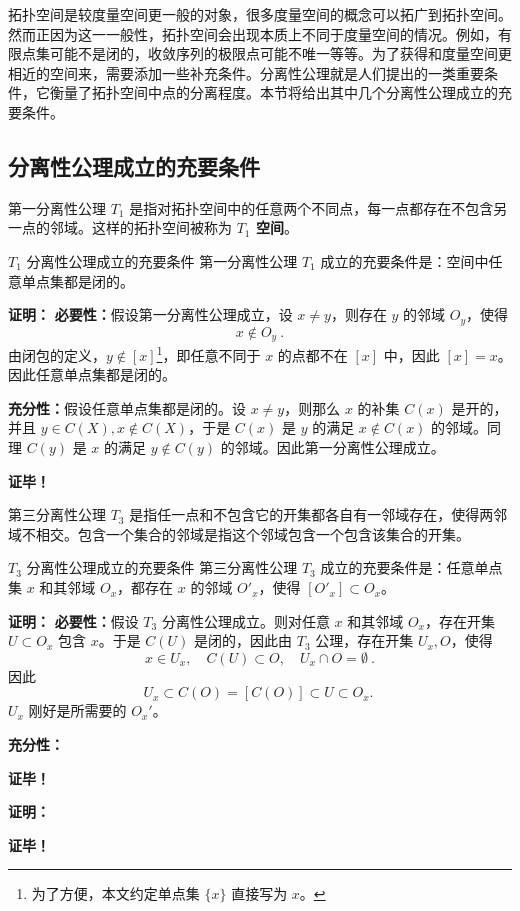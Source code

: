 
拓扑空间是较度量空间更一般的对象，很多度量空间的概念可以拓广到拓扑空间。然而正因为这一一般性，拓扑空间会出现本质上不同于度量空间的情况。例如，有限点集可能不是闭的，收敛序列的极限点可能不唯一等等。为了获得和度量空间更相近的空间来，需要添加一些补充条件。分离性公理就是人们提出的一类重要条件，它衡量了拓扑空间中点的分离程度。本节将给出其中几个分离性公理成立的充要条件。

\subsection{分离性公理成立的充要条件}
第一分离性公理 $T_1$ 是指对拓扑空间中的任意两个不同点，每一点都存在不包含另一点的邻域。这样的拓扑空间被称为\textbf{ $T_1$ 空间}。
\begin{theorem}{$T_1$ 分离性公理成立的充要条件}
第一分离性公理 $T_1$ 成立的充要条件是：空间中任意单点集都是闭的。
\end{theorem}
\textbf{证明：}
\textbf{必要性：}假设第一分离性公理成立，设 $x\neq y$，则存在 $y$ 的邻域 $O_y$，使得
\begin{equation}
x\notin O_y~.
\end{equation}
由闭包的定义，$y\notin [x]$\footnote{为了方便，本文约定单点集 $\{x\}$ 直接写为 $x$。}，即任意不同于 $x$ 的点都不在 $[x]$ 中，因此 $[x]=x$。因此任意单点集都是闭的。

\textbf{充分性：}假设任意单点集都是闭的。设 $x\neq y$，则那么 $x$ 的补集 $C(x)$ 是开的，并且 $y\in C(X),x\notin C(X)$，于是 $C(x)$ 是 $y$ 的满足 $x\notin C(x)$ 的邻域。同理 $C(y)$ 是 $x$ 的满足 $y\notin C(y)$ 的邻域。因此第一分离性公理成立。

\textbf{证毕！}



第三分离性公理 $T_3$ 是指任一点和不包含它的开集都各自有一邻域存在，使得两邻域不相交。包含一个集合的邻域是指这个邻域包含一个包含该集合的开集。


\begin{theorem}{$T_3$ 分离性公理成立的充要条件}
第三分离性公理 $T_3$ 成立的充要条件是：任意单点集 $x$ 和其邻域 $O_x$，都存在 $x$ 的邻域 $ O'_x$，使得 $[O'_x]\subset O_x$。
\end{theorem}

\textbf{证明：}
\textbf{必要性：}假设 $T_3$ 分离性公理成立。则对任意 $x$ 和其邻域 $O_x$，存在开集 $U\subset O_x$ 包含 $x$。于是 $C(U)$ 是闭的，因此由 $T_3$ 公理，存在开集 $U_x, O$，使得
\begin{equation}
x\in U_x,\quad C(U)\subset O,\quad U_x\cap O=\emptyset~.
\end{equation}
因此
\begin{equation}
U_x\subset C(O)=[C(O)]\subset U\subset O_x.~
\end{equation}
$U_x$ 刚好是所需要的 $O_x'$。

\textbf{充分性：}

\textbf{证毕！}









\textbf{证明：}


\textbf{证毕！}




